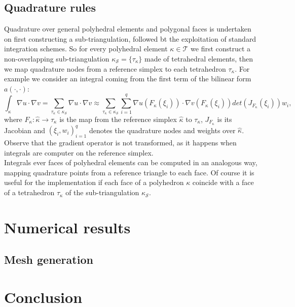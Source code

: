 \documentclass[12pt, a4paper]{article}
\theoremstyle{definition}
\theoremstyle{plain}
\theoremstyle{plain}
\begin{document}
\subsection{Quadrature rules}
Quadrature over general polyhedral elements and polygonal faces is undertaken on first constructing a sub-triangulation, followed bt the exploitation of standard integration schemes. So for every polyhedral element $\kappa \in \mathcal{T}$ we first construct a non-overlapping sub-triangulation $\kappa_\mathcal{S} = \{\tau_\kappa\}$ made of tetrahedral elements, then we map quadrature nodes from a reference simplex to each tetrahedron $\tau_\kappa$. For example we consider an integral coming from the first term of the bilinear form $a(\cdot, \cdot)$:
\begin{equation*}
	\int_\kappa \nabla u \cdot \nabla v = \sum_{\tau_\kappa \in \kappa_\mathcal{S}} \nabla u \cdot \nabla v \approx \sum_{\tau_\kappa \in \kappa_\mathcal{S}} \sum_{i=1}^{q} \nabla u(F_\kappa(\xi_i)) \cdot \nabla v(F_\kappa(\xi_i)) det(J_{F_\kappa}(\xi_i))w_i,
\end{equation*}
where $F_\kappa: \hat{\kappa} \rightarrow \tau_\kappa$ is the map from the reference
simplex $\hat{\kappa}$ to $\tau_\kappa$, $J_{F_\kappa}$ is its Jacobian	and $(\xi_i, w_i)^q_{i=1}$ denotes the quadrature nodes and weights over $\hat{\kappa}$. Observe that the gradient operator is not transformed, as it happens when integrals are computer on the reference simplex.\\
Integrals ever faces of polyhedral elements can be computed in an analogous way, mapping quadrature points from a reference triangle to each face. Of course it is useful for the implementation if each face of a polyhedron $\kappa$ coincide with a face of a tetrahedron $\tau_\kappa$ of the sub-triangulation $\kappa_\mathcal{S}$.
\section{Numerical results}\label{sec:res}
\subsection{Mesh generation}

\section{Conclusion}\label{sec:conc}
\end{document}
